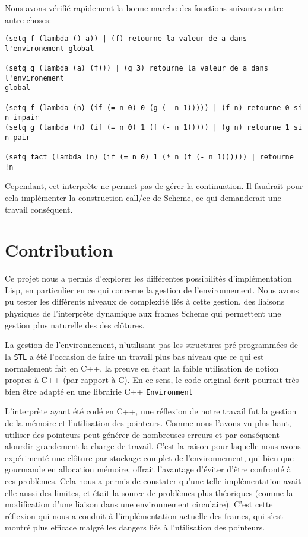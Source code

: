 \documentclass[a4paper,11pt]{article}
\begin{document}
 Nous avons vérifié rapidement la bonne marche des fonctions suivantes entre
 autre choses:

\begin{lstlisting}
(setq f (lambda () a)) | (f) retourne la valeur de a dans l'environement global

(setq g (lambda (a) (f))) | (g 3) retourne la valeur de a dans l'environement
global

(setq f (lambda (n) (if (= n 0) 0 (g (- n 1))))) | (f n) retourne 0 si n impair
(setq g (lambda (n) (if (= n 0) 1 (f (- n 1))))) | (g n) retourne 1 si n pair

(setq fact (lambda (n) (if (= n 0) 1 (* n (f (- n 1)))))) | retourne !n
\end{lstlisting}
 
 Cependant, cet interprète ne permet pas de gérer la continuation. Il faudrait pour 
 cela implémenter la construction call/cc de Scheme, ce qui demanderait une travail 
 conséquent.


\section{Contribution}

Ce projet nous a permis d'explorer les différentes possibilités d'implémentation 
Lisp, en particulier en ce qui concerne la gestion de l'environnement. Nous avons pu 
tester les différents niveaux de complexité liés à cette gestion, des liaisons physiques
de l'interprète dynamique aux frames Scheme qui permettent une gestion plus naturelle des
des clôtures.

La gestion de l'environnement, n'utilisant pas les structures pré-programmées de
la \texttt{STL} a été l'occasion de faire un travail plus bas niveau que ce qui
est normalement fait en C++, la preuve en étant la faible utilisation de
notion propres à C++ (par rapport à C). En ce sens, le code original écrit
pourrait très bien être adapté en une librairie C++ \texttt{Environment}

L'interprète ayant été codé en C++, une réflexion de notre travail fut la gestion de la 
mémoire et l’utilisation des pointeurs. Comme nous l'avons vu plus haut, utiliser 
des pointeurs peut générer de nombreuses erreurs et par conséquent alourdir grandement la charge 
de travail. C'est la raison pour laquelle nous avons expérimenté une clôture par stockage 
complet de l'environnement, qui bien que gourmande en allocation mémoire, offrait l'avantage 
d'éviter d'être confronté à ces problèmes. Cela nous a permis de constater qu'une telle 
implémentation avait elle aussi des limites, et était la source de problèmes plus théoriques 
(comme la modification d'une liaison dans une environnement circulaire). C'est cette réflexion 
qui nous a conduit à l'implémentation actuelle des frames, qui s'est montré plus efficace 
malgré les dangers liés à l'utilisation des pointeurs.
\end{document}

